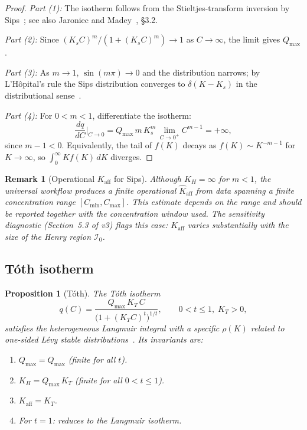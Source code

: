 \documentclass[12pt]{article}
\newtheorem{proposition}{Proposition}
\newtheorem{remark}{Remark}
\begin{document}
\begin{proof}
\textit{Part (1):} The isotherm follows from the Stieltjes-transform
inversion by Sips~\cite{Sips1948}; see also
Jaroniec and Madey~\cite{Jaroniec1988}, \S3.2.

\textit{Part (2):} Since $(K_s C)^m/(1+(K_s C)^m)\to 1$ as
$C\to\infty$, the limit gives $Q_{\max}$.

\textit{Part (3):} As $m\to 1$, $\sin(m\pi)\to 0$ and the
distribution narrows; by L'H\^opital's rule the Sips distribution
converges to $\delta(K-K_s)$ in the distributional
sense~\cite{Jaroniec1988}.

\textit{Part (4):} For $0<m<1$, differentiate the isotherm:
\[
  \frac{dq}{dC}\bigg|_{C\to 0}
  = Q_{\max}\,m\,K_s^m\,\lim_{C\to 0^+}C^{m-1}
  = +\infty,
\]
since $m-1<0$.  Equivalently, the tail of $f(K)$ decays as
$f(K)\sim K^{-m-1}$ for $K\to\infty$, so
$\int_0^\infty K f(K)\,dK$ diverges.
\end{proof}

\begin{remark}[Operational $K_{\mathrm{aff}}$ for Sips]
Although $K_H=\infty$ for $m<1$, the universal workflow produces a
\emph{finite} operational $\widehat{K}_{\mathrm{aff}}$ from data
spanning a finite concentration range $[C_{\min},C_{\max}]$.  This
estimate depends on the range and should be reported together with
the concentration window used.  The sensitivity diagnostic
(Section~5.3 of v3) flags this case: $K_{\mathrm{aff}}$ varies
substantially with the size of the Henry region $\mathcal{I}_0$.
\end{remark}

\subsection{T\'oth isotherm}

\begin{proposition}[T\'oth]
\label{prop:toth}
The T\'oth isotherm~\cite{Toth1971}
\begin{equation}
  q(C) = \frac{Q_{\max}\,K_T\,C}{\bigl(1+(K_T C)^t\bigr)^{1/t}},
  \qquad 0<t\le 1,\; K_T>0,
  \label{eq:toth}
\end{equation}
satisfies the heterogeneous Langmuir integral with a specific
$\rho(K)$ related to one-sided L\'evy stable
distributions~\cite{Jaroniec1975}.  Its invariants are:
\begin{enumerate}[nosep]
  \item $Q_{\max}=Q_{\max}$ (finite for all $t$).
  \item $K_H = Q_{\max}\,K_T$ (finite for all $0<t\le 1$).
  \item $K_{\mathrm{aff}} = K_T$.
  \item For $t=1$: reduces to the Langmuir isotherm.
\end{enumerate}
\end{proposition}
\end{document}
